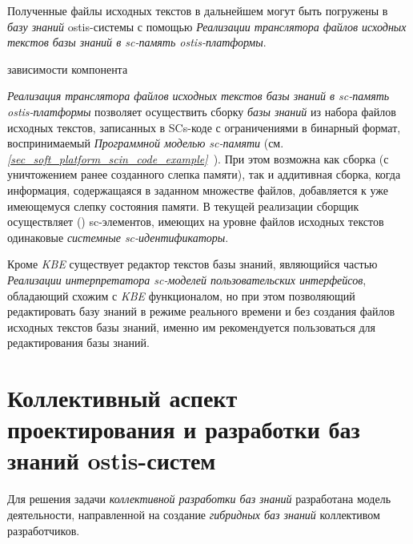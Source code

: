 Полученные файлы исходных текстов в дальнейшем могут быть погружены в \textit{базу знаний }ostis-системы с помощью \textit{Реализации транслятора файлов исходных текстов \textit{базы знаний} в sc-память ostis-платформы}.

\begin{SCn}
\begin{scnrelfromset}{зависимости компонента}
\end{scnrelfromset}
\end{SCn}

\textit{Реализация транслятора файлов исходных текстов базы знаний в sc-память ostis-платформы} позволяет осуществить сборку \textit{базы знаний} из набора файлов исходных текстов, записанных в SCs-коде с ограничениями в бинарный формат, воспринимаемый \textit{Программной моделью sc-памяти} (см. \textit{\ref{sec_soft_platform_scin_code_example}~}).
При этом возможна как сборка  (с уничтожением ранее созданного слепка памяти), так и аддитивная сборка, когда информация, содержащаяся в заданном множестве файлов, добавляется к уже имеющемуся слепку состояния памяти.
В текущей реализации сборщик осуществляет  () sc-элементов, имеющих на уровне файлов исходных текстов одинаковые \textit{системные sc-идентификаторы}.

Кроме \textit{KBE} существует редактор текстов базы знаний, являющийся частью \textit{Реализации интерпретатора sc-моделей пользовательских интерфейсов}, обладающий схожим с \textit{KBE} функционалом, но при этом позволяющий редактировать базу знаний в режиме реального времени и без создания файлов исходных текстов базы знаний, именно им рекомендуется пользоваться для редактирования базы знаний.

\section{Коллективный аспект проектирования и разработки баз знаний ostis-систем}
\label{sec_kb_design_collective}

Для решения задачи \textit{коллективной разработки баз знаний} разработана модель деятельности, направленной на создание \textit{гибридных баз знаний} коллективом разработчиков.

